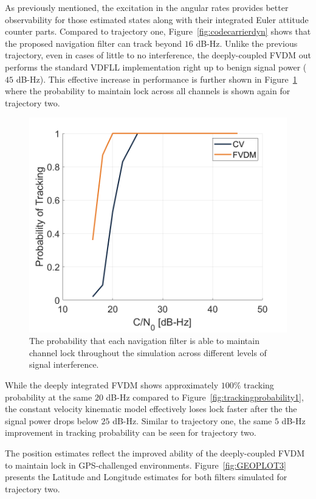 As previously mentioned, the excitation in the angular rates provides better observability for those estimated states along with their integrated Euler attitude counter parts. Compared to trajectory one, Figure~\ref{fig:codecarrierdyn} shows that the proposed navigation filter can track beyond \(16\) dB-Hz. Unlike the previous trajectory, even in cases of little to no interference, the deeply-coupled FVDM out performs the standard VDFLL implementation right up to benign signal power (\(45\) dB-Hz). This effective increase in performance is further shown in Figure~\ref{fig:trackingprobability2} where the probability to maintain lock across all channels is shown again for trajectory two.

\begin{figure}[!ht]
    \centering
    \includegraphics[width=0.5\linewidth]{Figures/dynamic/trackingprobdyn.png}
    \caption{The probability that each navigation filter is able to maintain channel lock throughout the simulation across different levels of signal interference.}\label{fig:trackingprobability2}
\end{figure}

While the deeply integrated FVDM shows approximately \(100\% \) tracking probability at the same \(20\) dB-Hz compared to Figure~\ref{fig:trackingprobability1}, the constant velocity kinematic model effectively loses lock faster after the the signal power drops below \(25\) dB-Hz. Similar to trajectory one, the same \(5\) dB-Hz improvement in tracking probability can be seen for trajectory two.

The position estimates reflect the improved ability of the deeply-coupled FVDM to maintain lock in GPS-challenged environments. Figure~\ref{fig:GEOPLOT3} presents the Latitude and Longitude estimates for both filters simulated for trajectory two.

